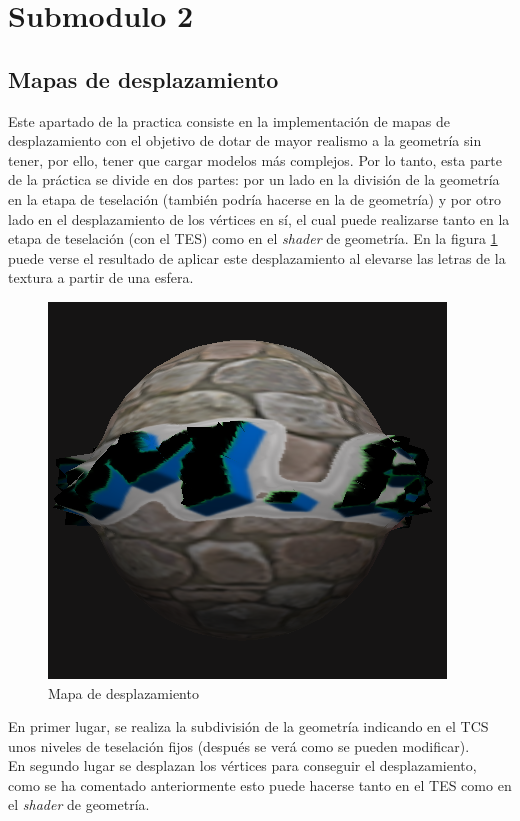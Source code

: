 \documentclass[10pt,oneside,a4paper]{article}
\begin{document}
\section{Submodulo 2}
\subsection{Mapas de desplazamiento}
Este apartado de la practica consiste en la implementación de mapas de desplazamiento con el objetivo de dotar de mayor realismo a la geometría sin tener, por ello, tener que cargar modelos más complejos. Por lo tanto, esta parte de la práctica se divide en dos partes: por un lado en la división de la geometría en la etapa de teselación (también podría hacerse en la de geometría) y por otro lado en el desplazamiento de los vértices en sí, el cual puede realizarse tanto en la etapa de teselación (con el TES) como en el \textit{shader} de geometría. En la figura \ref{fig:disp} puede verse el resultado de aplicar este desplazamiento al elevarse las letras de la textura a partir de una esfera.\\

\begin{figure}[!htb]
\centering
\includegraphics[width=.6\linewidth]{pgatrimgs/Displacement.png}
\caption{Mapa de desplazamiento}
\label{fig:disp}
\end{figure}

En primer lugar, se realiza la subdivisión de la geometría indicando en el TCS unos niveles de teselación fijos (después se verá como se pueden modificar).\\

En segundo lugar se desplazan los vértices para conseguir el desplazamiento, como se ha comentado anteriormente esto puede hacerse tanto en el TES como en el \textit{shader} de geometría.\\
\end{document}
